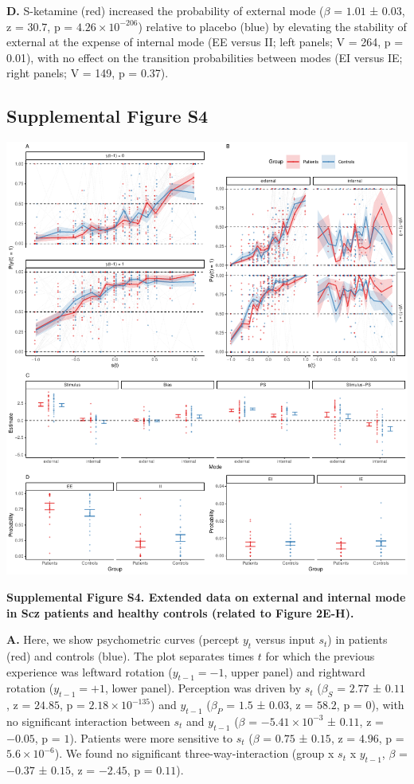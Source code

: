 \documentclass[
]{article}
\begin{document}
\textbf{D.} S-ketamine (red) increased the probability of external mode
(\(\beta\) = \(1.01\) ± \(0.03\), z = \(30.7\), p =
\(\ensuremath{4.26\times 10^{-206}}\)) relative to placebo (blue) by
elevating the stability of external at the expense of internal mode (EE
versus II; left panels; V = 264, p = 0.01), with no effect on the
transition probabilities between modes (EI versus IE; right panels; V =
149, p = 0.37).

\newpage

\subsection{Supplemental Figure S4}\label{supplemental-figure-s4}

\includegraphics{modes_ketamine_scz_files/figure-latex/Supplemental_Figure_S4-1.pdf}

\textbf{Supplemental Figure S4. Extended data on external and internal
mode in Scz patients and healthy controls (related to Figure 2E-H).}

\textbf{A.} Here, we show psychometric curves (percept \(y_t\) versus
input \(s_t\)) in patients (red) and controls (blue). The plot separates
times \(t\) for which the previous experience was leftward rotation
(\(y_{t-1} = -1\), upper panel) and rightward rotation
(\(y_{t-1} = +1\), lower panel). Perception was driven by \(s_t\)
(\(\beta_S\) = \(2.77\) ± \(0.11\), z = \(24.85\), p =
\(\ensuremath{2.18\times 10^{-135}}\)) and \(y_{t-1}\) (\(\beta_{P}\) =
\(1.5\) ± \(0.03\), z = \(58.2\), p = \(0\)), with no significant
interaction between \(s_t\) and \(y_{t-1}\) (\(\beta\) =
\(\ensuremath{-5.41\times 10^{-3}}\) ± \(0.11\), z = \(-0.05\), p =
\(1\)). Patients were more sensitive to \(s_t\) (\(\beta\) = \(0.75\) ±
\(0.15\), z = \(4.96\), p = \(\ensuremath{5.6\times 10^{-6}}\)). We
found no significant three-way-interaction (group x \(s_t\) x
\(y_{t-1}\), \(\beta\) = \(-0.37\) ± \(0.15\), z = \(-2.45\), p =
\(0.11\)).
\end{document}
